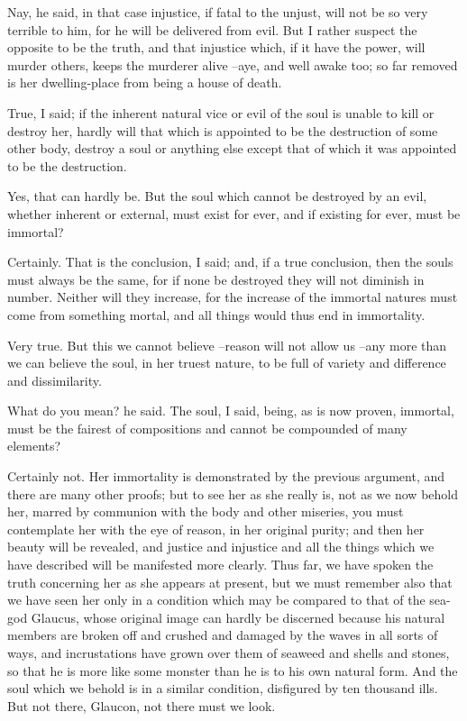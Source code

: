 Nay, he said, in that case injustice, if fatal to the unjust, will not be so very terrible to him, for he will be delivered from evil. But I rather suspect the opposite to be the truth, and that injustice which, if it have the power, will murder others, keeps the murderer alive --aye, and well awake too; so far removed is her dwelling-place from being a house of death.

True, I said; if the inherent natural vice or evil of the soul is unable to kill or destroy her, hardly will that which is appointed to be the destruction of some other body, destroy a soul or anything else except that of which it was appointed to be the destruction.

Yes, that can hardly be.
But the soul which cannot be destroyed by an evil, whether inherent or external, must exist for ever, and if existing for ever, must be immortal?

Certainly.
That is the conclusion, I said; and, if a true conclusion, then the souls must always be the same, for if none be destroyed they will not diminish in number. Neither will they increase, for the increase of the immortal natures must come from something mortal, and all things would thus end in immortality.

Very true.
But this we cannot believe --reason will not allow us --any more than we can believe the soul, in her truest nature, to be full of variety and difference and dissimilarity.

What do you mean? he said.
The soul, I said, being, as is now proven, immortal, must be the fairest of compositions and cannot be compounded of many elements?

Certainly not.
Her immortality is demonstrated by the previous argument, and there are many other proofs; but to see her as she really is, not as we now behold her, marred by communion with the body and other miseries, you must contemplate her with the eye of reason, in her original purity; and then her beauty will be revealed, and justice and injustice and all the things which we have described will be manifested more clearly. Thus far, we have spoken the truth concerning her as she appears at present, but we must remember also that we have seen her only in a condition which may be compared to that of the sea-god Glaucus, whose original image can hardly be discerned because his natural members are broken off and crushed and damaged by the waves in all sorts of ways, and incrustations have grown over them of seaweed and shells and stones, so that he is more like some monster than he is to his own natural form. And the soul which we behold is in a similar condition, disfigured by ten thousand ills. But not there, Glaucon, not there must we look.

